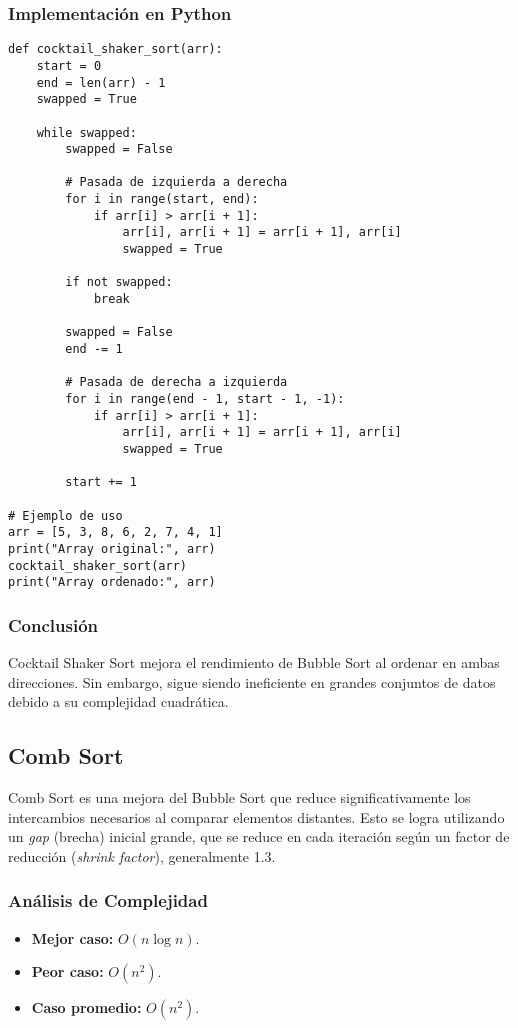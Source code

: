 \documentclass[11pt,openany]{book}
\begin{document}
\subsubsection{Implementación en Python}
\lstset{language=Python}
\begin{lstlisting}
def cocktail_shaker_sort(arr):
    start = 0
    end = len(arr) - 1
    swapped = True

    while swapped:
        swapped = False

        # Pasada de izquierda a derecha
        for i in range(start, end):
            if arr[i] > arr[i + 1]:
                arr[i], arr[i + 1] = arr[i + 1], arr[i]
                swapped = True

        if not swapped:
            break

        swapped = False
        end -= 1

        # Pasada de derecha a izquierda
        for i in range(end - 1, start - 1, -1):
            if arr[i] > arr[i + 1]:
                arr[i], arr[i + 1] = arr[i + 1], arr[i]
                swapped = True

        start += 1

# Ejemplo de uso
arr = [5, 3, 8, 6, 2, 7, 4, 1]
print("Array original:", arr)
cocktail_shaker_sort(arr)
print("Array ordenado:", arr)
\end{lstlisting}

\subsubsection{Conclusión}
Cocktail Shaker Sort mejora el rendimiento de Bubble Sort al ordenar en ambas direcciones. Sin embargo, sigue siendo ineficiente en grandes conjuntos de datos debido a su complejidad cuadrática.

\subsection{Comb Sort}
Comb Sort es una mejora del Bubble Sort que reduce significativamente los intercambios necesarios al comparar elementos distantes. Esto se logra utilizando un \textit{gap} (brecha) inicial grande, que se reduce en cada iteración según un factor de reducción (\textit{shrink factor}), generalmente 1.3.

\subsubsection{Análisis de Complejidad}
\begin{itemize}
    \item \textbf{Mejor caso:} $O(n \log n)$.
    \item \textbf{Peor caso:} $O(n^2)$.
    \item \textbf{Caso promedio:} $O(n^2)$.
\end{itemize}
\end{document}
